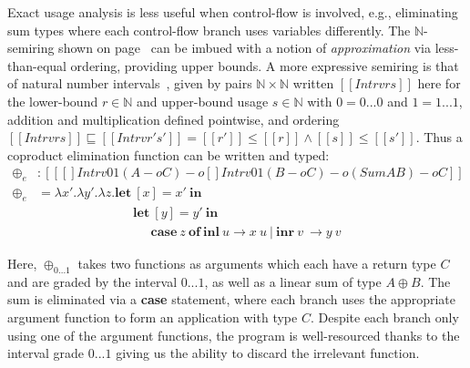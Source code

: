 \begin{example}%
\label{exm:or3}
Exact usage analysis is less useful when control-flow is involved, e.g.,
eliminating sum types where each control-flow branch uses variables differently.
The $\mathbb{N}$-semiring shown on page~\pageref{ex:s-comb} can be imbued with a
notion of \emph{approximation} via less-than-equal ordering, providing upper
bounds. A more expressive semiring is that of natural number
intervals~\citep{DBLP:journals/pacmpl/OrchardLE19}, given by pairs $\mathbb{N}
\times \mathbb{N}$ written $[[ Intrv r s ]]$ here for the lower-bound $r \in
\mathbb{N}$ and upper-bound usage $s \in \mathbb{N}$ with $0 = 0 ... 0$ and $1 =
1 ... 1$, addition and multiplication defined pointwise, and ordering $[[ Intrv
r s ]] \sqsubseteq [[ Intrv r' s' ]] = [[ r' ]] \leq [[ r ]] \wedge [[ s ]] \leq
[[ s' ]]$. Thus a coproduct elimination function can be written and typed:
%
\begin{align*}
\oplus_e & : [[ {[] {Intrv 0 1} (A -o C)} -o {{[] {Intrv 0 1} (B -o C)} -o {(Sum A B) -o C}} ]] \\
\oplus_e & =
\lambda x' . \lambda y' . \lambda z. \textbf{let}\ [x] = x'\ \textbf {in}\ \\ 
          & \;\;\;\;\;\;\;\;\;\;\;\;\;\;\;\;\;\;\;\;\;\;\;\;\;\;\; \textbf{let}\ [y] = y'\ \textbf{in}\ \\ 
          & \;\;\;\;\;\;\;\;\;\;\;\;\;\;\;\;\;\;\;\;\;\;\;\;\;\;\;\;\;\;\;\; \textbf{case}\ z\ \textbf{of}\
\textbf{inl}\ u \rightarrow x\ u\ |\ \textbf{inr}\ v\ \rightarrow y\ v
\end{align*}
\end{example}

Here, $\oplus_{0...1}$ takes two functions as arguments which each have a return
type $C$ and are graded by the interval $0...1$, as well as a linear sum of type $A
\oplus B$. The sum is eliminated via a \textbf{case} statement, where each branch 
uses the appropriate argument function to form an application with type $C$. Despite 
each branch only using one of the argument functions, the program is well-resourced thanks 
to the interval grade $0...1$ giving us the ability to discard the irrelevant function.  

